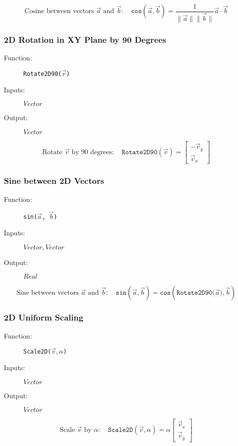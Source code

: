 \documentclass{article}
\begin{document}
\[
\text{Cosine between vectors } \vec{a} \text{ and }  \vec{b} : \quad \texttt{cos}(\vec{a}, \vec{b}) =
\frac{1}{\| \vec{a} \| \| \vec{b} \|} \vec{a} \cdot \vec{b}
\]

\subsubsection{2D Rotation in XY Plane by 90 Degrees}

\begin{description}
\item[Function:] \texttt{Rotate2D90(\(\vec{v}\))}
\item[Inputs:] $Vector$
\item[Output:] $Vector$
\end{description}

\[
\text{Rotate } \vec{v} \text{ by 90 degrees} : \quad \texttt{Rotate2D90}(\vec{v}) = \begin{bmatrix}
-\vec{v}_y \\
\vec{v}_x
\end{bmatrix}
\]

\subsubsection{Sine between 2D Vectors}

\begin{description}
\item[Function:] \texttt{sin(\(\vec{a}\), \(\vec{b}\))}
\item[Inputs:] $Vector, Vector$
\item[Output:] $Real$
\end{description}

\[
\text{Sine between vectors } \vec{a} \text{ and }  \vec{b} : \quad \texttt{sin}(\vec{a}, \vec{b}) =
\texttt{cos}(\texttt{Rotate2D90(\(\vec{a}\))}, \vec{b})
\]

\subsubsection{2D Uniform Scaling}

\begin{description}
\item[Function:] \texttt{Scale2D(\(\vec{v}, \alpha\))}
\item[Inputs:] $Vector$
\item[Output:] $Vector$
\end{description}

\[
\text{Scale } \vec{v} \text{ by } \alpha : \quad \texttt{Scale2D}(\vec{v}, \alpha) = \alpha \begin{bmatrix}
\vec{v}_x \\
\vec{v}_y
\end{bmatrix}
\]
\end{document}
